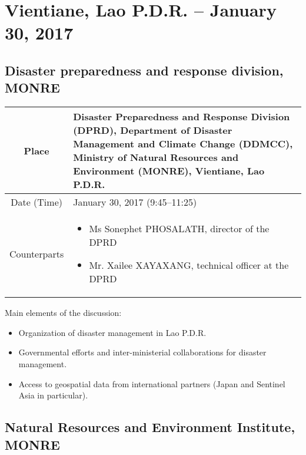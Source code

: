 \section{Vientiane, Lao P.D.R. -- January 30, 2017}


\subsection{Disaster preparedness and response division, MONRE}

\begin{table}[H]
   \centering
   \begin{tabular}{| c | p{12 cm} |}
   \hline
    Place & Disaster Preparedness and Response Division (DPRD), Department of Disaster Management and Climate Change (DDMCC), Ministry of Natural Resources and Environment (MONRE), Vientiane, Lao P.D.R. \\ \hline
    Date (Time) & January 30, 2017 (9:45--11:25) \\ \hline
    Counterparts & \begin{itemize} \item Ms Sonephet PHOSALATH, director of the DPRD \item Mr. Xailee XAYAXANG, technical officer at the DPRD  \end{itemize} \\ \hline   
   \end{tabular}
\end{table}

Main elements of the discussion:

\begin{itemize}

\item Organization of disaster management in Lao P.D.R.

\item Governmental efforts and inter-ministerial collaborations for disaster management.

\item Access to geospatial data from international partners (Japan and Sentinel Asia in particular).

\end{itemize}


\subsection{Natural Resources and Environment Institute, MONRE}

